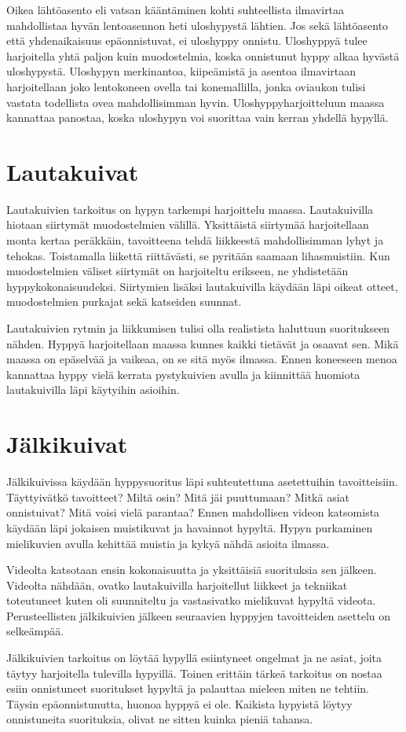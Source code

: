 Oikea lähtöasento eli vatsan kääntäminen kohti suhteellista ilmavirtaa mahdollistaa hyvän lentoasennon heti uloshypystä lähtien. Jos sekä lähtöasento että yhdenaikaisuus epäonnistuvat, ei uloshyppy onnistu. Uloshyppyä tulee harjoitella yhtä paljon kuin muodostelmia, koska onnistunut hyppy alkaa hyvästä uloshypystä. Uloshypyn merkinantoa, kiipeämistä ja asentoa ilmavirtaan harjoitellaan joko lentokoneen ovella tai konemallilla, jonka oviaukon tulisi vastata todellista ovea mahdollisimman hyvin. Uloshyppyharjoitteluun maassa kannattaa panostaa, koska uloshypyn voi suorittaa vain kerran yhdellä hypyllä. 

\section{ Lautakuivat }
\label{hypyn-lapikayminen-maassa-lautakuivat}


Lautakuivien tarkoitus on hypyn tarkempi harjoittelu maassa. Lautakuivilla hiotaan siirtymät muodostelmien välillä. Yksittäistä siirtymää harjoitellaan monta kertaa peräkkäin, tavoitteena tehdä liikkeestä mahdollisimman lyhyt ja tehokas. Toistamalla liikettä riittävästi, se pyritään saamaan lihasmuistiin. Kun muodostelmien väliset siirtymät on harjoiteltu erikseen, ne yhdistetään hyppykokonaisuudeksi. Siirtymien lisäksi lautakuivilla käydään läpi oikeat otteet, muodostelmien purkajat sekä katseiden suunnat. 


Lautakuivien rytmin ja liikkumisen tulisi olla realistista haluttuun suoritukseen nähden. Hyppyä harjoitellaan maassa kunnes kaikki tietävät ja osaavat sen. Mikä maassa on epäselvää ja vaikeaa, on se sitä myös ilmassa. Ennen koneeseen menoa kannattaa hyppy vielä kerrata pystykuivien avulla ja kiinnittää huomiota lautakuivilla läpi käytyihin asioihin. 

\section{ Jälkikuivat }
\label{hypyn-lapikayminen-maassa-jalkikuivat}


Jälkikuivissa käydään hyppysuoritus läpi suhteutettuna asetettuihin tavoitteisiin. Täyttyivätkö tavoitteet? Miltä osin? Mitä jäi puuttumaan? Mitkä asiat onnistuivat? Mitä voisi vielä parantaa? Ennen mahdollisen videon katsomista käydään läpi jokaisen muistikuvat ja havainnot hypyltä. Hypyn purkaminen mielikuvien avulla kehittää muistia ja kykyä nähdä asioita ilmassa. 


Videolta katsotaan ensin kokonaisuutta ja yksittäisiä suorituksia sen jälkeen. Videolta nähdään, ovatko lautakuivilla harjoitellut liikkeet ja tekniikat toteutuneet kuten oli suunniteltu ja vastasivatko mielikuvat hypyltä videota. Perusteellisten jälkikuivien jälkeen seuraavien hyppyjen tavoitteiden asettelu on selkeämpää. 


Jälkikuivien tarkoitus on löytää hypyllä esiintyneet ongelmat ja ne asiat, joita täytyy harjoitella tulevilla hypyillä. Toinen erittäin tärkeä tarkoitus on nostaa esiin onnistuneet suoritukset hypyltä ja palauttaa mieleen miten ne tehtiin. Täysin epäonnistunutta, huonoa hyppyä ei ole. Kaikista hypyistä löytyy onnistuneita suorituksia, olivat ne sitten kuinka pieniä tahansa. 

